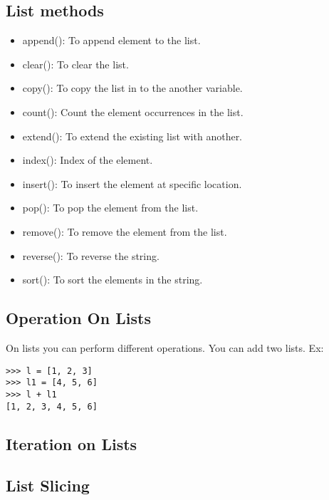 \documentclass[letterpaper,12pt]{book}
\begin{document}
\subsection{List methods}
\begin{itemize}
\item append(): To append element to the list.
\item clear(): To clear the list.
\item copy(): To copy the list in to the another variable.
\item count(): Count the element occurrences in the list.
\item extend(): To extend the existing list with another.
\item index(): Index of the element.
\item insert(): To insert the element at specific location.
\item pop(): To pop the element from the list.
\item remove(): To remove the element from the list.
\item reverse(): To reverse the string.
\item sort(): To sort the elements in the string.
\end{itemize}

\subsection{Operation On Lists}
On lists you can perform different operations. You can add two lists. Ex:
\begin{verbatim}
>>> l = [1, 2, 3]
>>> l1 = [4, 5, 6]
>>> l + l1
[1, 2, 3, 4, 5, 6]
\end{verbatim}
\subsection{Iteration on Lists}
\subsection{List Slicing}
\end{document}
